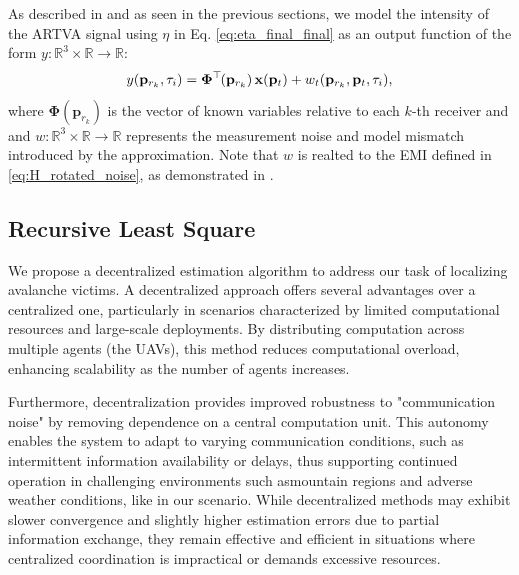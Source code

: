 \noindent
As described in \cite{similar-main} and as seen in the previous sections, 
we model the intensity of the ARTVA signal using $\eta$ in Eq. \ref{eq:eta_final_final} 
as an output function of the form \( y : \mathbb{R}^3 \times \mathbb{R} \rightarrow \mathbb{R} \):
\[
y(\mathbf{p}_{r_k}, \tau_i) = \mathbf{\Phi}^\top\mkern-2mu(\mathbf{p}_{r_k}) \, \mathbf{x}(\mathbf{p}_t) + 
w_t(\mathbf{p}_{r_k}, \mathbf{p}_t, \tau_i),
\]
where $\mathbf{\Phi}(\mathbf{p}_{r_k})$ is the vector of known variables
relative to each $k$-th receiver and 
and \( w : \mathbb{R}^3 \times \mathbb{R} \rightarrow \mathbb{R} \) 
represents the measurement noise and model 
mismatch introduced by the approximation.
Note that $w$ is realted to the EMI defined in \ref{eq:H_rotated_noise}, as demonstrated in \cite{similar-main}.

\subsection{Recursive Least Square}
We propose a decentralized estimation algorithm to address our task of localizing avalanche 
victims. A decentralized approach offers several advantages over a centralized one, particularly 
in scenarios characterized by limited computational resources and large-scale deployments. 
By distributing computation across multiple agents (the UAVs), this method reduces computational 
overload, enhancing scalability as the number of agents increases.

Furthermore, decentralization provides improved robustness to "communication noise" by removing 
dependence on a central computation unit. This autonomy enables the system to adapt to varying 
communication conditions, such as intermittent information availability or delays, thus supporting 
continued operation in challenging environments such asmountain regions and adverse weather 
conditions, like in our scenario. While decentralized methods may exhibit slower convergence and slightly higher estimation 
errors due to partial information exchange, they remain effective and efficient in situations where 
centralized coordination is impractical or demands excessive resources.

